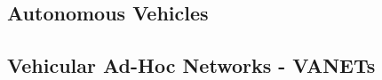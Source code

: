 \documentclass{llncs}
\begin{document}
{%
%			


		
		\subsection{Autonomous Vehicles}
			\label{ss:autonomous-vehicles}

		
		\subsection{Vehicular Ad-Hoc Networks - VANETs}
			\label{ss:vanets}
			
}
\end{document}
